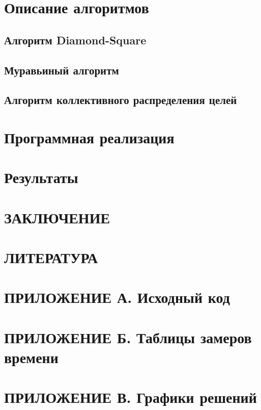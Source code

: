 \documentclass{article}
\begin{document}
	\newpage
    \section{Описание алгоритмов}

    \subsection{Алгоритм Diamond-Square}

    \subsection{Муравьиный алгоритм}

    \subsection{Алгоритм коллективного распределения целей}

    \newpage
    \section{Программная реализация}

	\newpage
    \section{Результаты}

    \newpage
    \section*{ЗАКЛЮЧЕНИЕ}

    \newpage
    \section*{ЛИТЕРАТУРА}


    \newpage
    \section*{ПРИЛОЖЕНИЕ А. Исходный код}

    \newpage
    \section*{ПРИЛОЖЕНИЕ Б. Таблицы замеров времени}

    \newpage
    \section*{ПРИЛОЖЕНИЕ В. Графики решений}
\end{document}
